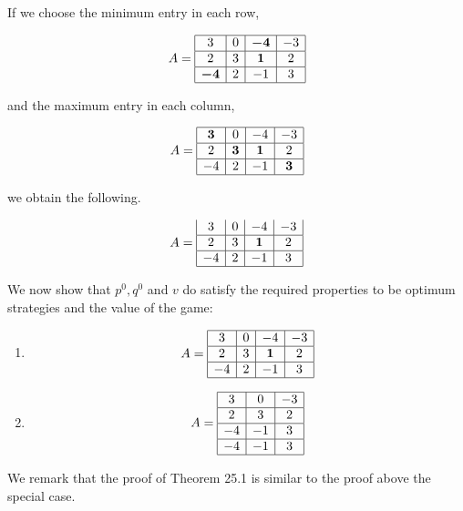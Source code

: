 \documentclass[]{report}
\begin{document}

If we choose the minimum entry in each row,

\[
A = 
\begin{array}{|c|c|c|c|} \hline
3 & 0 & \boldsymbol{-4} & -3 \\ \hline
2 & 3 & \boldsymbol{1} & 2 \\ \hline
\boldsymbol{-4} & 2 & -1 & 3 \\ \hline
\end{array}
\]



 and the maximum entry in each column, 

\[
A = 
\begin{array}{|c|c|c|c|} \hline
\boldsymbol{3} & 0 & -4 & -3 \\ \hline
2 & \boldsymbol{3} & \boldsymbol{1} & 2 \\ \hline
-4 & 2 & -1 & \boldsymbol{3} \\ \hline
\end{array}
\]


we obtain the following.

\[
A = 
\begin{array}{|c|c|c|c|}
3 & 0 & -4 & -3 \\ \hline 
2 & 3 & \boldsymbol{1} & 2 \\ \hline
-4 & 2 & -1 & 3 \\ \hline
\end{array}
\]

We now show that $p^0,q^0$ and $v$ do satisfy the required properties to be optimum strategies and the value of the game:
\begin{enumerate}
\item
\[
A = 
\begin{array}{|c|c|c|c|} \hline
3 & 0 & -4 & -3 \\ \hline
2 & 3 & \boldsymbol{1} & 2 \\ \hline
-4 & 2 & -1 & 3 \\ \hline
\end{array}
\]
\item
\[
A = 
\begin{array}{|c|c|c|} \hline
3 & 0  & -3 \\ \hline
2 & 3 & 2 \\ \hline
-4 &  -1 & 3 \\ \hline
-4 &  -1 & 3 \\ \hline
\end{array}
\]

\end{enumerate}
We remark that the proof of Theorem 25.1 is similar to the proof above the special case.
\end{document}
